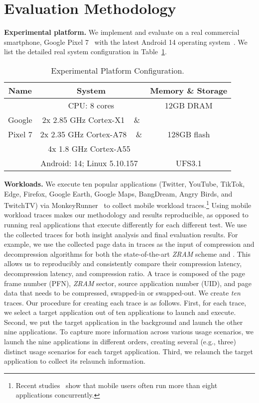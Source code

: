 \section{Evaluation Methodology}
\label{sec:evaluation}

\noindent\textbf{Experimental platform.} 
We implement and evaluate \proposal on a real commercial smartphone,
Google Pixel 7~\cite{Pixel7} with the latest Android 14 operating system~\cite{Android14}.
We list the detailed real system configuration in Table~\ref{tab:phones}.

\begin{table}[h!]
\centering
\caption{Experimental Platform Configuration.}
\footnotesize
\begin{tabular}{c|c|c}
\hline
\textbf{Name} & \textbf{System}& \textbf{Memory \& Storage} \\ \hline
\hline
 & CPU: 8 cores  & 12GB DRAM\\
Google  &2x 2.85 GHz Cortex-X1 ~\cite{dempsey2021reviews} \& &\\
Pixel 7 &2x 2.35 GHz Cortex-A78 ~\cite{al2023comparative} \& & 128GB flash\\
&4x 1.8 GHz Cortex-A55~\cite{seo2020optimized} & \\
& Android: 14; Linux 5.10.157~\cite{Android14} & UFS3.1\\
\hline
\end{tabular}
\label{tab:phones}
\end{table}

\noindent\textbf{Workloads.}
We execute ten %
popular applications (Twitter, YouTube, TikTok, Edge, Firefox, Google Earth, Google Maps, BangDream, Angry Birds, and TwitchTV) via MonkeyRunner~\cite{monkey} to collect mobile workload traces.\footnote{Recent studies~\cite{liang2020acclaim, liang2022cachesifter} show that mobile users often run more than eight applications concurrently.}
Using mobile workload traces makes our methodology and results reproducible, as opposed to running real applications that execute differently for each different test. We use the collected traces for both insight analysis and final evaluation results. For example, we use the collected page data in traces as the input of compression and decompression algorithms for both the state-of-the-art \emph{ZRAM} scheme and \proposal. This allows us to reproducibly and consistently compare their compression latency, decompression latency, and compression ratio.
A trace is composed of the page frame number (PFN),  \emph{ZRAM} sector, source application number (UID), and page data that needs to be compressed, swapped-in or swapped-out.
We create \emph{ten} traces. Our procedure for creating each trace is as follows. First, for each trace, we select a target application out of ten applications to launch and execute. Second, we put the target application in the background and launch the other nine applications. To capture more information across various usage scenarios, we launch the nine applications in different orders, creating several (e.g., three) distinct usage scenarios for each target application. Third, we relaunch the target application to collect its relaunch information.

